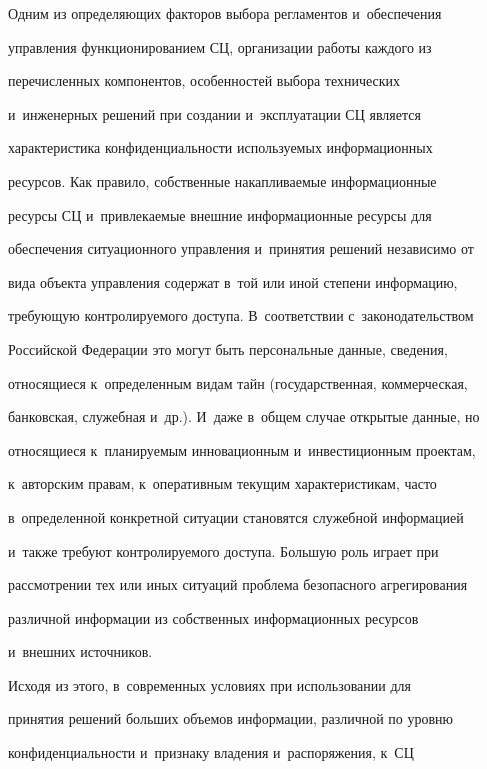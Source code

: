     

        \vspace*{-2pt}

    

    Одним из определяющих факторов выбора регламентов и~обеспечения 

управ\-ле\-ния функционированием СЦ, организации работы каждого из 

перечисленных компонентов, особенностей выбора технических 

и~инженерных решений при создании и~эксплуатации СЦ является 

характеристика конфиденциальности используемых информационных 

ресурсов. Как правило, собственные накапливаемые информационные 

ресурсы СЦ и~привлекаемые внешние информационные ресурсы для 

обеспечения ситуационного управления и~принятия решений независимо от 

вида объекта управления содержат в~той или иной степени информацию, 

требующую контролируемого доступа. В~соответствии с~законодательством 

Российской Федерации это могут быть персональные данные, сведения, 

относящиеся к~определенным видам тайн (государственная, коммерческая, 

банковская, служебная и~др.). И~даже в~общем случае открытые данные, но 

относящиеся к~планируемым инновационным и~инвестиционным проектам, 

к~авторским правам, к~оперативным текущим характеристикам, часто 

в~определенной конкретной ситуации становятся служебной информацией 

и~также требуют контролируемого доступа. Большую роль играет при 

рассмотрении тех или иных ситуаций проблема безопасного агрегирования 

различной информации из собственных информационных ресурсов 

и~внешних источников. 

    

    Исходя из этого, в~современных условиях при использовании для 

принятия решений больших объемов информации, различной по уровню 

конфиденциальности и~признаку владения и~распоряжения, к~СЦ 

